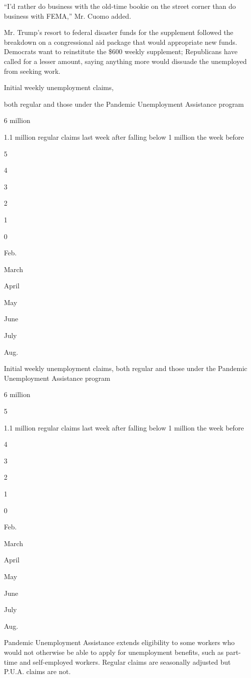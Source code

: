 ``I'd rather do business with the old-time bookie on the street corner
than do business with FEMA,'' Mr. Cuomo added.

Mr. Trump's resort to federal disaster funds for the supplement followed
the breakdown on a congressional aid package that would appropriate new
funds. Democrats want to reinstitute the \$600 weekly supplement;
Republicans have called for a lesser amount, saying anything more would
dissuade the unemployed from seeking work.

Initial weekly unemployment claims,

both regular and those under the Pandemic Unemployment Assistance
program

6 million

1.1 million regular claims last week after falling below 1 million the
week before

5

4

3

2

1

0

Feb.

March

April

May

June

July

Aug.

Initial weekly unemployment claims, both regular and those under the
Pandemic Unemployment Assistance program

6 million

5

1.1 million regular claims last week after falling below 1 million the
week before

4

3

2

1

0

Feb.

March

April

May

June

July

Aug.

Pandemic Unemployment Assistance extends eligibility to some workers who
would not otherwise be able to apply for unemployment benefits, such as
part-time and self-employed workers. Regular claims are seasonally
adjusted but P.U.A. claims are not.

